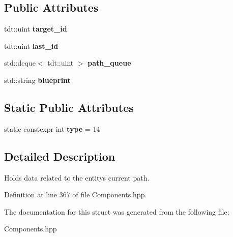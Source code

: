 \subsection*{Public Attributes}
\begin{DoxyCompactItemize}
\item 
tdt\+::uint {\bfseries target\+\_\+id}\hypertarget{struct_pathfinding_component_a702c1d838c506aed0f3cd53d3f3ebb65}{}\label{struct_pathfinding_component_a702c1d838c506aed0f3cd53d3f3ebb65}

\item 
tdt\+::uint {\bfseries last\+\_\+id}\hypertarget{struct_pathfinding_component_a1daf41de8bc5482685438a17a3468b99}{}\label{struct_pathfinding_component_a1daf41de8bc5482685438a17a3468b99}

\item 
std\+::deque$<$ tdt\+::uint $>$ {\bfseries path\+\_\+queue}\hypertarget{struct_pathfinding_component_ae4c40d5450a651ed5ba379f64dee4da2}{}\label{struct_pathfinding_component_ae4c40d5450a651ed5ba379f64dee4da2}

\item 
std\+::string {\bfseries blueprint}\hypertarget{struct_pathfinding_component_a52000821d45f0fef9e1393d4a43d2747}{}\label{struct_pathfinding_component_a52000821d45f0fef9e1393d4a43d2747}

\end{DoxyCompactItemize}
\subsection*{Static Public Attributes}
\begin{DoxyCompactItemize}
\item 
static constexpr int {\bfseries type} = 14\hypertarget{struct_pathfinding_component_a24b75510a249b07034b96bd6d4524c58}{}\label{struct_pathfinding_component_a24b75510a249b07034b96bd6d4524c58}

\end{DoxyCompactItemize}


\subsection{Detailed Description}
Holds data related to the entity\textquotesingle{}s current path. 

Definition at line 367 of file Components.\+hpp.



The documentation for this struct was generated from the following file\+:\begin{DoxyCompactItemize}
\item 
Components.\+hpp\end{DoxyCompactItemize}

